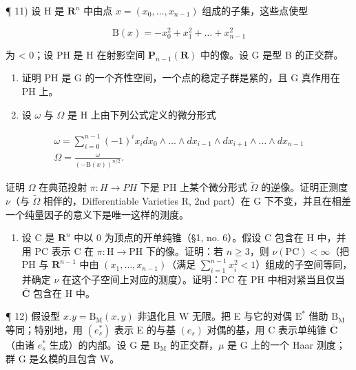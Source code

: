 ¶ 11) 设 H 是 \(\mathbf{R}^n\) 中由点 \(x = (x_0, \ldots, x_{n-1})\) 组成的子集，这些点使型

\[
\mathrm{B} (x) = - x _ {0} ^ {2} + x _ {1} ^ {2} + \dots + x _ {n - 1} ^ {2}
\]

为 \textless{} 0；设 PH 是 H 在射影空间 \(\mathbf{P}_{n-1}(\mathbf{R})\) 中的像。设 G 是型 B 的正交群。

\begin{enumerate}
\def\labelenumi{\alph{enumi})}
\item
  证明 PH 是 G 的一个齐性空间，一个点的稳定子群是紧的，且 G 真作用在 PH 上。
\item
  设 \(\omega\) 与 \(\Omega\) 是 H 上由下列公式定义的微分形式
\end{enumerate}

\[
\begin{array}{c} \omega = \sum_ {i = 0} ^ {n - 1} (- 1) ^ {i} x _ {i} d x _ {0} \wedge \dots \wedge d x _ {i - 1} \wedge d x _ {i + 1} \wedge \dots \wedge d x _ {n - 1} \\ \Omega = \frac {\omega}{(- \mathrm{B} (x)) ^ {n / 2}}. \end{array}
\]

证明 \(\Omega\) 在典范投射 \(\pi:H\to PH\) 下是 PH 上某个微分形式 \(\tilde{\Omega}\) 的逆像。证明正测度 \(\nu\)（与 \(\tilde{\Omega}\) 相伴的，Differentiable Varieties R, 2nd part）在 G 下不变，并且在相差一个纯量因子的意义下是唯一这样的测度。

\begin{enumerate}
\def\labelenumi{\alph{enumi})}
\setcounter{enumi}{2}
\tightlist
\item
  设 C 是 \(\mathbf{R}^n\) 中以 0 为顶点的开单纯锥（§1, no. 6）。假设 C 包含在 H 中，并用 PC 表示 C 在 \(\pi: \mathrm{H} \to \mathrm{PH}\) 下的像。证明：若 \(n \geqslant 3\)，则 \(\nu(\mathrm{PC}) < \infty\)（把 PH 与 \(\mathbf{R}^{n-1}\) 中由 \((x_1, \ldots, x_{n-1})\)（满足 \(\sum_{i=1}^{n-1} x_i^2 < 1\)）组成的子空间等同，并确定 \(\nu\) 在这个子空间上对应的测度）。证明：PC 在 PH 中相对紧当且仅当 \(\overline{\mathbf{C}}\) 包含在 H 中。
\end{enumerate}

¶ 12) 假设型 \(x.y = \mathrm{B}_{\mathrm{M}}(x,y)\) 非退化且 W 无限。把 E 与它的对偶 \(\mathrm{E}^*\) 借助 \(\mathrm{B}_{\mathrm{M}}\) 等同；特别地，用 \((e_s^*)\) 表示 E 的与基 \((e_s)\) 对偶的基，用 C 表示单纯锥 \(\overline{\mathbf{C}}\)（由诸 \(e_s^*\) 生成）的内部。设 G 是 \(\mathrm{B}_{\mathrm{M}}\) 的正交群，\(\mu\) 是 G 上的一个 Haar 测度；群 G 是幺模的且包含 W。


